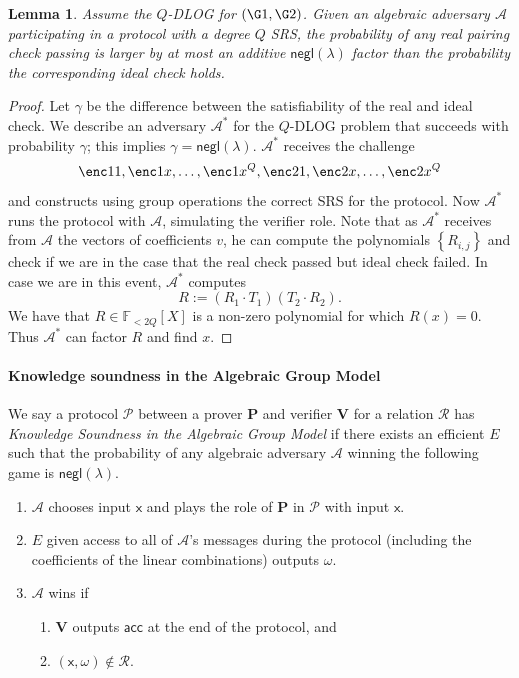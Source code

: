 \documentclass[11pt]{article} %
\newcommand{\F}{\ensuremath{\mathbb F}\xspace}
\newcommand{\adv}{\ensuremath{\mathcal A}\xspace}
\newcommand{\negl}{\ensuremath{\mathsf{negl}(\lambda)}\xspace}
\newcommand{\acc}{\ensuremath{\mathsf{acc}}\xspace}
\newcommand{\defeq}{:=}
\newcommand{\prv}{\ensuremath{\mathsf{\mathbf{P}}}\xspace}
\newcommand{\inp}{\ensuremath{\mathsf{x}}\xspace}
\newcommand{\wit}{\ensuremath{\omega}\xspace}
\newcommand{\ver}{\ensuremath{\mathsf{\mathbf{V}}}\xspace}
\newcommand{\rel}{\ensuremath{\mathcal{R}}\xspace}
\newcommand{\ext}{\ensuremath{E}\xspace}
\newcommand{\advv}{\ensuremath{ {\mathcal A}^{\mathbf{*}}}\xspace} %
\newcommand{\set}[1]{\ensuremath{\left\{#1\right\}}\xspace}
\newcommand{\polysofdeg}[1]{\ensuremath{\F_{< #1}[X]}\xspace}
\newcommand{\prot}{\ensuremath{\mathscr{P}}\xspace}
\newtheorem{lemma}{Lemma}[section]
\begin{document}
\begin{lemma}\label{lem:AGManalysis}
Assume the $Q$-DLOG for $(\G1,\G2)$.
 Given an algebraic adversary \adv participating in a protocol with a degree $Q$ SRS,
 the probability of any real pairing check passing is larger by at most an additive \negl factor than the probability the corresponding ideal check holds.
\end{lemma}
\begin{proof}
 Let $\gamma$ be the difference between the satisfiability of the real and ideal check.
 We describe an adversary \advv for the $Q$-DLOG problem that succeeds with probability $\gamma$; this implies $\gamma=\negl$.
 \advv receives the challenge 
 \[\enc1{1},\enc1{x},\ldots,\enc1{x^Q},\enc2{1},\enc2{x},\ldots,\enc2{x^Q}\]
and constructs using group operations the correct SRS for the protocol.
 Now \advv runs the protocol with \adv, simulating the verifier role. Note that as \advv receives from \adv the vectors of coefficients $v$, he can compute the polynomials \set{R_{i,j}} and check if we are in the case that the real check passed but ideal check failed.
 In case we are in this event, \advv computes
 \[R\defeq (R_1 \cdot T_1)(T_2\cdot R_2). \]
 We have that $R\in\polysofdeg{2Q}$ is a non-zero polynomial for which
 $R(x)=0$. Thus \advv can factor $R$ and find $x$.
\end{proof}


\paragraph{Knowledge soundness in the Algebraic Group Model}
We say a protocol \prot between a prover \prv and verifier \ver for a relation \rel has \emph{Knowledge Soundness in the Algebraic Group Model} if there exists an efficient \ext such that
the probability of any algebraic adversary \adv winning the following game is \negl.

\begin{enumerate}
 \item \adv chooses input \inp and plays the role of \prv in \prot with input \inp.
 \item \ext given access to all of \adv's messages during the protocol (including the coefficients of the linear combinations) outputs \wit.
 \item \adv wins if 
 \begin{enumerate}
  \item \ver outputs \acc at the end of the protocol, and 
  \item $(\inp,\wit)\notin \rel$.
 \end{enumerate}

\end{enumerate}
\end{document}
